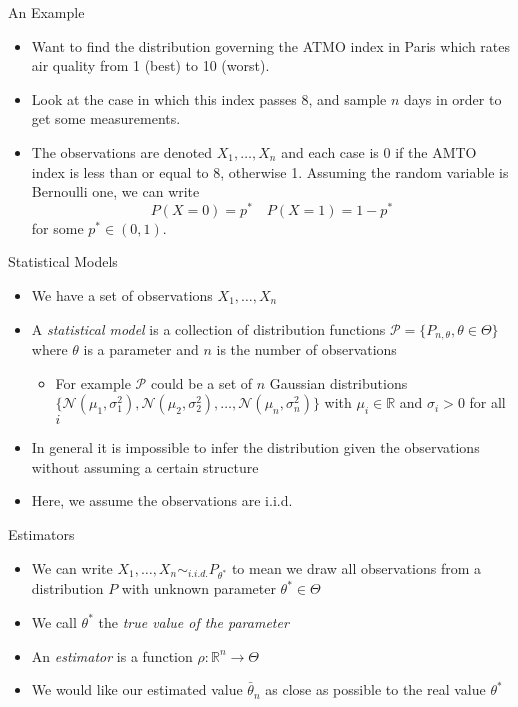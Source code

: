 \documentclass{beamer}
\begin{document}
\begin{frame}{An Example} 
\begin{itemize}
 \item Want to find the distribution governing the ATMO index in Paris which rates air quality from 1 (best) to 10 (worst). 
 \item Look at the case in which this index passes 8, and sample $n$ days in order to get some measurements. 
 \item The observations are denoted $X_1, \ldots, X_n$ and each case is 0 if the AMTO index is less than or equal to 8, otherwise 1. Assuming the random variable is Bernoulli one, we can write 
\begin{displaymath}
P(X = 0) = p^* \quad P(X = 1) = 1- p^*  
\end{displaymath}
for some $p^* \in (0, 1)$. 
\end{itemize}
\end{frame}

\begin{frame}{Statistical Models} 
\begin{itemize} 
 \item We have a set of observations $X_1, \ldots, X_n$
 \item A \emph{statistical model} is a collection of distribution functions $\mathcal{P} = \{P_{n, \theta}, \theta \in \Theta\}$ where $\theta$ is a parameter and $n$ is the number of observations 
 \begin{itemize} 
  \item For example $\mathcal{P}$ could be a set of $n$ Gaussian distributions $\{\mathcal{N}(\mu_1, \sigma^2_1), \mathcal{N}(\mu_2, \sigma^2_2), \ldots, \mathcal{N}(\mu_n, \sigma^2_n)\}$ with $\mu_i \in \mathbb{R}$ and $\sigma_i > 0$ for all $i$  
 \end{itemize}
 \item In general it is impossible to infer the distribution given the observations without assuming a certain structure 
 \item Here, we assume the observations are i.i.d. 
\end{itemize}
\end{frame}

\begin{frame}{Estimators} 
\begin{itemize} 
\item We can write $X_1, \ldots, X_n \sim_{i.i.d.} P_{\theta^*}$ to mean we draw all observations from a distribution $P$ with unknown parameter $\theta^* \in \Theta$
\item We call $\theta^*$ the \emph{true value of the parameter}
\item An \emph{estimator} is a function $\rho: \mathbb{R}^n \rightarrow \Theta$  
\item We would like our estimated value $\bar{\theta}_n$ as close as possible to the real value $\theta^*$
\end{itemize}
\end{frame}
\end{document}

